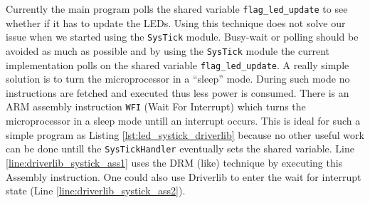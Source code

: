 Currently the main program polls the shared variable \texttt{flag\_led\_update} to see whether if it has to update the LEDs.
Using this technique does not solve our issue when we started using the \texttt{SysTick} module.
Busy-wait or polling should be avoided as much as possible and by using the \texttt{SysTick} module the current implementation polls on the shared variable \texttt{flag\_led\_update}.
A really simple solution is to turn the microprocessor in a \enquote{sleep} mode.
During such mode no instructions are fetched and executed thus less power is consumed.
There is an ARM assembly instruction \texttt{WFI} (Wait For Interrupt) which turns the microprocessor in a sleep mode untill an interrupt occurs.
This is ideal for such a simple program as Listing \ref{lst:led_systick_driverlib} because no other useful work can be done untill the \texttt{SysTickHandler} eventually sets the shared variable.
Line \ref{line:driverlib_systick_ass1} uses the DRM (like) technique by executing this Assembly instruction.
One could also use Driverlib to enter the wait for interrupt state (Line \ref{line:driverlib_systick_ass2}).

